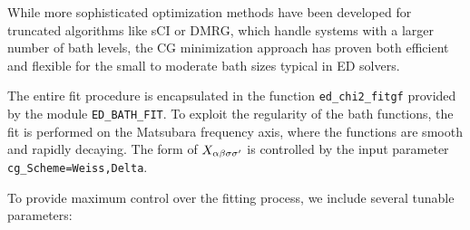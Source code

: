 \documentclass[edipack2.tex]{subfiles}
\begin{document}
While more sophisticated optimization methods have been developed for 
truncated algorithms like sCI\cite{Mejuto_Bath_ASCI-DMFT} or DMRG\cite{boh}, 
which handle systems with a 
larger number of bath levels, the CG minimization approach has proven 
both efficient and flexible for the small to moderate bath sizes 
typical in ED solvers. 

The entire fit procedure is encapsulated in the function 
\texttt{ed\_chi2\_fitgf} provided by the module 
\texttt{ED\_BATH\_FIT}. To exploit the regularity of the bath functions, 
the fit is performed on the Matsubara frequency axis, where the functions 
are smooth and rapidly decaying. The form of $X_{\alpha\beta\sigma\sigma'}$ is controlled 
by the input parameter \texttt{cg\_Scheme=Weiss,Delta}.

To provide maximum control over the fitting process, we include several 
tunable parameters:
\end{document}
